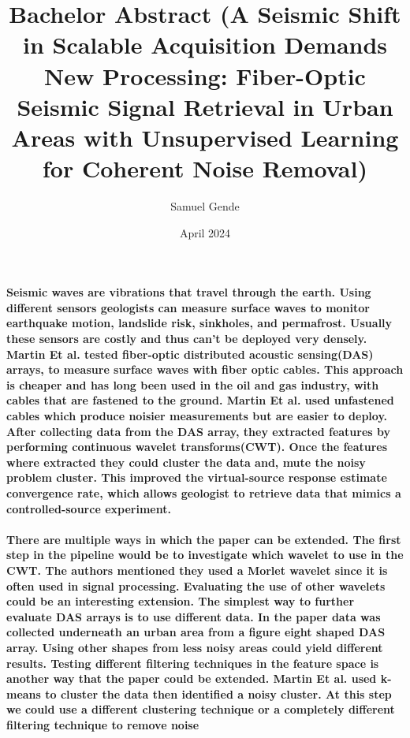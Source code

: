 \documentclass{article}
\title{Bachelor Abstract
(A Seismic Shift in Scalable Acquisition Demands New Processing: Fiber-Optic Seismic Signal Retrieval in Urban Areas with Unsupervised Learning for Coherent Noise Removal)}
\author{Samuel Gende }
\date{April 2024}
\begin{document}
\maketitle

\paragraph{Seismic waves are vibrations that travel through the earth. Using different sensors geologists can measure surface waves to monitor earthquake motion, landslide risk, sinkholes, and permafrost. Usually these sensors are costly and thus can't be deployed very densely. Martin Et al. tested fiber-optic distributed acoustic sensing(DAS) arrays, to measure surface waves with fiber optic cables. This approach is cheaper and has long been used in the oil and gas industry, with cables that are fastened to the ground. Martin Et al. used unfastened cables which produce noisier measurements but are easier to deploy. After collecting data from the DAS array, they extracted features by performing continuous wavelet transforms(CWT). Once the features where extracted they could cluster the data and, mute the noisy problem cluster. This improved the virtual-source response estimate convergence rate, which allows geologist to retrieve data that mimics a controlled-source experiment. }

\paragraph{There are multiple ways in which the paper can be extended. The first step in the pipeline would be to investigate which wavelet to use in the CWT. The authors mentioned they used a Morlet wavelet since it is often used in signal processing. Evaluating the use of other wavelets could be an interesting extension. The simplest way to further evaluate DAS arrays is to use different data. In the paper data was collected underneath an urban area from a figure eight shaped DAS array. Using other shapes from less noisy areas could yield different results. Testing different filtering techniques in the feature space is another way that the paper could be extended. Martin Et al. used k-means to cluster the data then identified a noisy cluster. At this step we could use a different clustering technique or a completely different filtering technique to remove noise }
\end{document}
